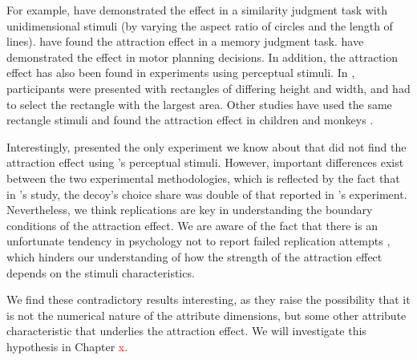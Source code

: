 \documentclass[11pt,a4paper]{article}
\begin{document}
For example,  have demonstrated the effect in a similarity judgment task with unidimensional stimuli (by varying the aspect ratio of circles and the length of lines).  have found the attraction effect in a memory judgment task.   have demonstrated the effect in motor planning decisions. In addition, the attraction effect has also been found in experiments using perceptual stimuli. In \citeauthor{Trueblood2013}, participants were presented with rectangles of differing height and width, and had to select the rectangle with the largest area. Other studies have used the same rectangle stimuli and found the attraction effect in children \cite{Zhen2016} and monkeys \cite{Parrish2015}.

 Interestingly, \citeauthor{Frederick2014} presented the only experiment we know about that did not find the attraction effect using 's perceptual stimuli. However, important differences exist between the two experimental methodologies, which is reflected by the fact that in \citeauthor{Frederick2014}'s study, the decoy's choice share was double of that reported in \citeauthor{Trueblood2013}'s experiment. Nevertheless, we think replications are key in understanding the boundary conditions of the attraction effect. We are aware of the fact that there is an unfortunate tendency in psychology not to report failed replication attempts \cite{Ingre2015}, which hinders our understanding of how the strength of the attraction effect depends on the stimuli characteristics.

We find these contradictory results interesting, as they raise the possibility that it is not the numerical nature of the attribute dimensions, but some other attribute characteristic that underlies the attraction effect. We will investigate this hypothesis in Chapter \textcolor{red}{x}.














\newpage


\end{document}
